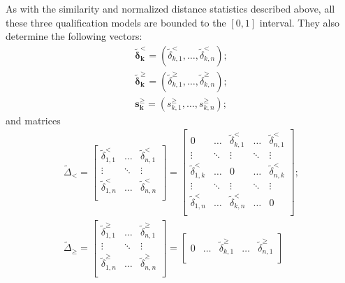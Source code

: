 \documentclass{elsarticle} %
\begin{document}
As with the similarity and normalized distance statistics described above, all these three qualification models are bounded to the $[0,1]$ interval. They also determine the following vectors:
\begin{gather}
    \boldsymbol{\tilde{\delta}_{k}^{<}} = (\tilde{\delta}_{k,1}^{<}, \dots, \tilde{\delta}_{k,n}^{<})
    ;\\
    \boldsymbol{\tilde{\delta}_{k}^{\geq}} = (\tilde{\delta}_{k,1}^{\geq}, \dots, \tilde{\delta}_{k,n}^{\geq})
    ;\\
    \boldsymbol{s_{k}^{\geq}} = (s_{k,1}^{\geq}, \dots, s_{k,n}^{\geq})
    ;
\end{gather}
and matrices
\begin{gather}
    \textbf{$\tilde{\Delta}$}_{\boldsymbol{<}} =
    \begin{bmatrix}
        \tilde{\delta}_{1,1}^{<} & \hdots & \tilde{\delta}_{n,1}^{<}\\
        \vdots & \ddots & \vdots\\
        \tilde{\delta}_{1,n}^{<} & \hdots & \tilde{\delta}_{n,n}^{<}\\
    \end{bmatrix} = 
    \begin{bmatrix}
        0 & \hdots & \tilde{\delta}_{k,1}^{<} & \hdots & \tilde{\delta}_{n,1}^{<}\\
        \vdots & \ddots & \vdots & \ddots & \vdots\\
        \tilde{\delta}_{1,k}^{<} & \hdots & 0 & \hdots & \tilde{\delta}_{n,k}^{<}\\
        \vdots & \ddots & \vdots & \ddots & \vdots\\
        \tilde{\delta}_{1,n}^{<} & \hdots & \tilde{\delta}_{k,n}^{<} & \hdots & 0\\
    \end{bmatrix}
    ;\\
    \textbf{$\tilde{\Delta}$}_{\boldsymbol{\geq}} =
    \begin{bmatrix}
        \tilde{\delta}_{1,1}^{\geq} & \hdots & \tilde{\delta}_{n,1}^{\geq}\\
        \vdots & \ddots & \vdots\\
        \tilde{\delta}_{1,n}^{\geq} & \hdots & \tilde{\delta}_{n,n}^{\geq}\\
    \end{bmatrix} = 
    \begin{bmatrix}
        0 & \hdots & \tilde{\delta}_{k,1}^{\geq} & \hdots & \tilde{\delta}_{n,1}^{\geq}\\

\end{bmatrix}
\end{gather}
\end{document}
